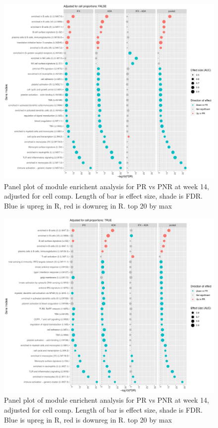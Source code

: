 \begin{outline}
\begin{figure}
    \centering
    \includegraphics[width=1.0\textwidth,page=1]{mainmatter/figures/chapter_04/plot_gene_set_enrichment.tmodCERNO_panelplot_reversed_C_3RI_3NI,C_3RA_3NA,C_(3RI_3NI)_(3RA_3NA),C_3R_3N.cell_prop_correction_FALSE.pdf}
    \caption{Panel plot of module enrichent analysis for PR vs PNR at week 14, adjusted for cell comp. Length of bar is effect size, shade is FDR. Blue is upreg in R, red is downreg in R. top 20 by max}
    \label{fig:multipants_dge_panelPlot_week_14_R_N_cellPropF}
\end{figure}

\begin{figure}
    \centering
    \includegraphics[width=1.0\textwidth,page=1]{mainmatter/figures/chapter_04/plot_gene_set_enrichment.tmodCERNO_panelplot_reversed_C_3RI_3NI,C_3RA_3NA,C_(3RI_3NI)_(3RA_3NA),C_3R_3N.cell_prop_correction_TRUE.pdf}
    \caption{Panel plot of module enrichent analysis for PR vs PNR at week 14, adjusted for cell comp. Length of bar is effect size, shade is FDR. Blue is upreg in R, red is downreg in R. top 20 by max}
    \label{fig:multipants_dge_panelPlot_week_14_R_N_cellPropT}
\end{figure}


\end{outline}
